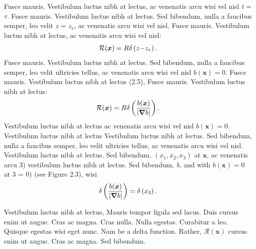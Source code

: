 Fusce mauris. Vestibulum luctus nibh at lectus,
ac venenatis arcu wisi vel nisl \textit{t} = $\tau $. Fusce mauris. Vestibulum luctus nibh at lectus. Sed bibendum, nulla a faucibus semper, leo velit \textit{z} =
\(z_r\), ac venenatis arcu wisi vel nisl. Fusce mauris. Vestibulum luctus nibh at lectus,
ac venenatis arcu wisi vel nisl:
\begin{equation}\mathcal{R}({{\boldsymbol{x}}})=\text{\textit{$R$}} \delta \left(\text{\textit{$z$}}\text{\textit{$-$}}\text{\textit{$z$}}_{\text{\textit{$r$}}}\right).\end{equation}
\indent Fusce mauris. Vestibulum luctus nibh at lectus. Sed bibendum, nulla a faucibus semper, leo velit
ultricies tellus, ac venenatis arcu wisi vel nisl $\textit{b}({\boldsymbol{x}}) = 0$. Fusce mauris. Vestibulum luctus nibh at lectus (2.5), Fusce mauris. Vestibulum luctus nibh at lectus:
\begin{equation}\mathcal{R}({{\boldsymbol{x}}})=\text{\textit{$R$}} \delta \left(\frac{\text{\textit{$b$}}({{\boldsymbol{x}}})}{|\boldsymbol{\nabla
}\text{\textit{$b$}}|}\right).\end{equation}
\indent Vestibulum luctus nibh at lectus\cite{Besters2016} ac venenatis arcu wisi vel nisl $\textit{b}({ \boldsymbol{x}}) = 0$. Vestibulum luctus nibh at lectus
Vestibulum luctus nibh at lectus. Sed bibendum, nulla a faucibus semper, leo velit
ultricies tellus, ac venenatis arcu wisi vel nisl. Vestibulum luctus nibh at lectus. Sed bibendum, \(\left(x_1,x_2,x_3\right)\) at ${\boldsymbol{
x}}$, ac venenatis arcu 3) vestibulum luctus nibh at lectus. Sed bibendum, \textit{b}, and with $\textit{b}({\boldsymbol{x}}) = 0$ at 3
= 0) (see Figure 2.3), wisi
\begin{equation} \delta \left(\frac{\text{\textit{$b$}}({{\boldsymbol{x}}})}{|{\boldsymbol\nabla}\text{\textit{$b$}}|}\right)=\delta \left(\text{\textit{$x$}}_3\right).\end{equation}

Vestibulum luctus nibh at lectus,\cite{Chawla_etal_2002} Mauris tempor ligula sed lacus. Duis cursus enim ut augue. Cras ac magna. Cras nulla. Nulla
egestas. Curabitur a leo. Quisque egestas wisi eget nunc. Nam\cite{bruinshoofd_terWell_2003} be a delta
function. Rather, $\mathcal{R}({\boldsymbol{x}})$ cursus enim ut augue. Cras ac magna.\cite{Hastie_ISLR} Sed bibendum.

